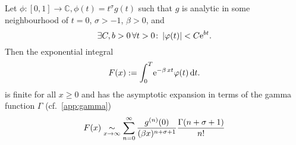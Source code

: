Let $\phi\colon [0,1] \to \mathbb{C}, \phi(t) = t^\sigma g(t)$ such that $g$ is
analytic in some neighbourhood of $t=0$, $\sigma > -1$, $\beta > 0$, and
\begin{equation*}
  \exists C, b > 0\, \forall t > 0\colon \Abs{\phi(t)} < C \Eto{bt}.
\end{equation*}
Then the exponential integral
\begin{align*}
  F(x) := \Integ[T]{0}{t}{\Eto{-\beta\,xt}\phi(t)}.
\end{align*}
is finite for all $x \geq 0$ and has the asymptotic expansion in terms of the
gamma function $\Gamma$ (cf.\ \cref{app:gamma})
\begin{equation*}
  F(x)\SimAs{x\to\infty}\sum_{n=0}^{\infty}
  \frac{g^{(n)}(0)}{(\beta x)^{n+\sigma+1}} \frac{\Gamma(n+\sigma+1)}{n!}
\end{equation*}
